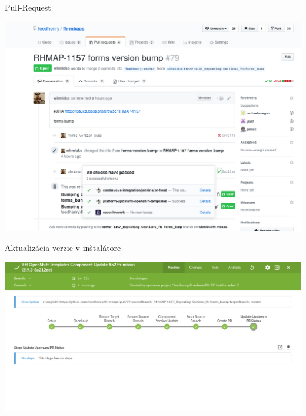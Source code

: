 \documentclass[bigger]{beamer}
\begin{document}
\begin{frame}[label={sec:org476f058}]{Pull-Request}
\begin{center}
\includegraphics[width=.9\linewidth]{./010fhmbaas.png}
\end{center}
\end{frame}
\begin{frame}[label={sec:org01fa9ef}]{Aktualizácia verzie v inštalátore}
\begin{center}
\includegraphics[width=.9\linewidth]{./013fhmbaas.png}
\end{center}
\end{frame}
\end{document}
